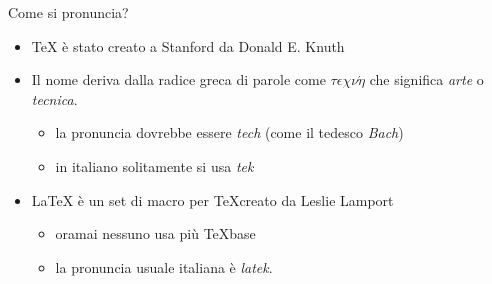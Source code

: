 \documentclass{beamer}
\begin{document}
\begin{frame}{Come si pronuncia?}

\begin{itemize}
\item \TeX{} \`e stato creato a Stanford da Donald E. Knuth
\item Il nome deriva dalla radice greca di parole come
\textbf{$\tau\epsilon\chi\nu\acute{\eta}$}
che significa \emph{arte} o \emph{tecnica}.
\begin{itemize}
\item la pronuncia dovrebbe essere \emph{tech} (come il tedesco \emph{Bach})
\item in italiano solitamente si usa \emph{tek}
\end{itemize}
\item \LaTeX{} \`e un set di macro per \TeX creato da Leslie Lamport

\begin{itemize}
\item oramai nessuno usa pi\`u \TeX base
\item la pronuncia usuale italiana \`e \emph{latek}.
\end{itemize}
\end{itemize}
\end{frame}

%
%
\end{document}
